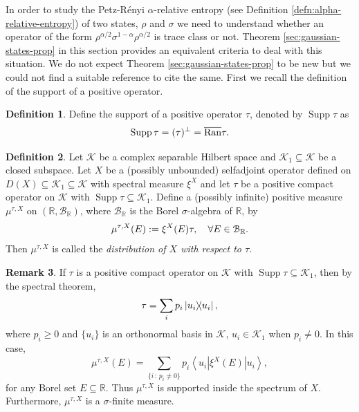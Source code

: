 \documentclass[12pt,a4paper,oneside]{article}
\numberwithin{equation}{section}
\theoremstyle{definition}  %
\newtheorem{defn}{Definition}[section]
\newtheorem{rmk}[defn]{Remark}
\theoremstyle{plain}  %
\theoremstyle{remark} %
\newcommand{\CK}{\mathcal{K}}
\let\tr\relax
\DeclareMathOperator{\tr}{Tr}
\let\ker\relax
\DeclareMathOperator{\ker}{Ker}
\DeclareMathOperator{\ran}{Ran}
\DeclareMathOperator{\supp}{Supp}
\begin{document}
In order to study the Petz-R\'enyi $\alpha$-relative entropy (see Definition \ref{defn:alpha-relative-entropy}) of two states, $\rho$ and $\sigma$    we need to understand whether an operator of the form $\rho^{\alpha/2}\sigma^{1-\alpha}\rho^{\alpha/2}$ is trace class or not. Theorem \ref{sec:gaussian-states-prop} in this section provides an equivalent criteria to deal with this situation. We do not expect Theorem \ref{sec:gaussian-states-prop} to be new but we could not find a suitable reference to cite the same. First we recall the definition of the support of a positive operator.
\begin{defn}\label{defn:support}
 Define the support of a positive operator $\tau$, denoted by $\supp\tau$ as \[\supp\tau = (\ker\tau)^{\perp} = \overline{\ran}\tau.\]
\end{defn}
\begin{defn}\label{sec:states-observables-1}\label{defn:moments}Let $\CK$ be a complex separable Hilbert space and $\CK_1\subseteq \CK$ be a closed subspace. Let
  $X$ be a (possibly unbounded) selfadjoint operator defined on $D(X)\subseteq\CK_1\subseteq \CK$  with spectral measure $\xi^{X}$  and let $\tau$ be a positive compact operator on   $\CK$ with $\supp \tau \subseteq \CK_1$. Define a (possibly infinite) positive measure $\mu^{\tau,X}$ on $(\mathbb{R}, \mathcal{B}_{\mathbb{R}})$, where $\mathcal{B}_{\mathbb{R}}$ is the Borel $\sigma$-algebra of $\mathbb{R}$, by  \[\mu^{\tau,X}(E):= \tr \xi^{X}(E)\tau,\quad \forall E \in \mathcal{B}_{\mathbb{R}}.\] Then $\mu^{\tau,X}$ is called the \emph{distribution of  $X$ with respect to $\tau$}.
\end{defn}
\begin{rmk} \label{rmk:distribution}
If $\tau$ is a positive compact operator on $\CK$  with $\supp \tau \subseteq \CK_1$, then by the spectral theorem, 
\begin{equation}
\label{eq:15}
\tau = \sum_{i}p_{i}\ketbra{u_i}{u_{i}},
\end{equation}
 where $p_{i}\geq 0$ and  $\{u_i\}$ is an  orthonormal basis in $\CK$, $u_i\in \CK_1$ when $p_i\neq 0$. In this case, \begin{equation}
\label{eq:9}
\mu^{\tau,X}(E) = \sum\limits_{\{i\,:\, p_i\neq 0\}}^{}p_i \left\langle u_i|\xi^X(E)|u_i \right\rangle,
 \end{equation} 
 for any Borel set $E \subseteq \mathbb{R}$.  Thus $\mu^{\tau,X}$ is supported inside the spectrum of $X$. Furthermore, $\mu^{\tau,X}$ is a $\sigma$-finite measure.
\end{rmk}
\end{document}
